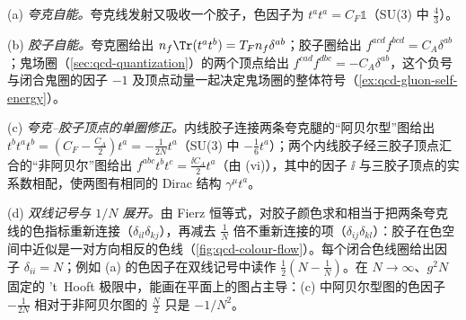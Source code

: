 \begin{example}[单圈图的色因子与双线记号]\label{ex:qcd-colour-algebra}
(a) \emph{夸克自能。}夸克线发射又吸收一个胶子，色因子为 $t^at^a=C_F\mathbb 1$（SU(3) 中 $\frac43$）。

(b) \emph{胶子自能。}夸克圈给出 $n_f\Tr(t^at^b)=T_Fn_f\delta^{ab}$；胶子圈给出 $f^{acd}f^{bcd}=C_A\delta^{ab}$；鬼场圈（\cref{sec:qcd-quantization}）的两个顶点给出 $f^{cad}f^{dbc}=-C_A\delta^{ab}$，这个负号与闭合鬼圈的因子 $-1$ 及顶点动量一起决定鬼场圈的整体符号（\cref{ex:qcd-gluon-self-energy}）。

(c) \emph{夸克--胶子顶点的单圈修正。}内线胶子连接两条夸克腿的“阿贝尔型”图给出 $t^bt^at^b=(C_F-\frac{C_A}2)t^a=-\frac1{2N}t^a$（SU(3) 中 $-\frac16t^a$）；两个内线胶子经三胶子顶点汇合的“非阿贝尔”图给出 $f^{abc}t^bt^c=\frac{\ii C_A}2t^a$（由 (vi)），其中的因子 $\ii$ 与三胶子顶点的实系数相配，使两图有相同的 Dirac 结构 $\gamma^\mu t^a$。

(d) \emph{双线记号与 $1/N$ 展开。}由 Fierz 恒等式，对胶子颜色求和相当于把两条夸克线的色指标重新连接（$\delta_{il}\delta_{kj}$），再减去 $\frac1N$ 倍不重新连接的项（$\delta_{ij}\delta_{kl}$）：胶子在色空间中近似是一对方向相反的色线（\cref{fig:qcd-colour-flow}）。每个闭合色线圈给出因子 $\delta_{ii}=N$；例如 (a) 的色因子在双线记号中读作 $\frac12(N-\frac1N)$。在 $N\to\infty$、$g^2N$ 固定的 't~Hooft 极限中，能画在平面上的图占主导：(c) 中阿贝尔型图的色因子 $-\frac1{2N}$ 相对于非阿贝尔图的 $\frac N2$ 只是 $-1/N^2$。
\end{example}

